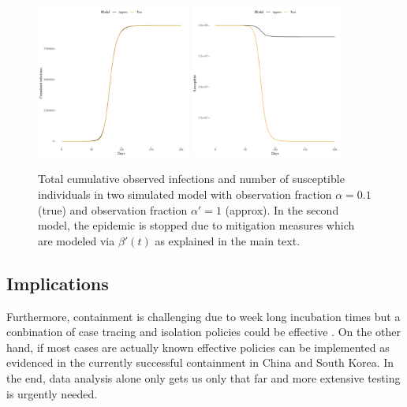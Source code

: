 \documentclass[fullpage,a4paper]{article}
\begin{document}
\begin{figure}
  \includegraphics[width=0.45\textwidth]{../figs/approx_infect.pdf}
  \includegraphics[width=0.45\textwidth]{../figs/approx_suscept.pdf}
  \caption{\label{fig:SIRapprox} Total cumulative observed infections
    and number of susceptible individuals in two simulated model with
    observation fraction $\alpha = 0.1$ (true) and observation
    fraction $\alpha' = 1$ (approx). In the second model, the epidemic
    is stopped due to mitigation measures which are modeled via
    $\beta'(t)$ as explained in the main text.}
\end{figure}

\subsection{Implications}

Furthermore, containment is challenging due to week
long incubation times
\cite{https://doi.org/10.1101/2020.03.25.20043109} but a conbination
of case tracing and isolation policies could be effective
\cite{fraser04,kubinec}. On the other hand, if most cases are actually
known effective policies can be implemented as evidenced in the
currently successful containment in China and South Korea. In the end,
data analysis alone only gets us only that far and more extensive
testing is urgently needed.
\end{document}
